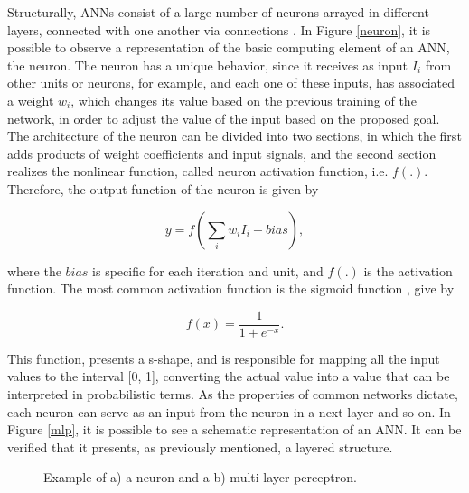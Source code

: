 Structurally, \ac{ANNs} consist of a large number of neurons arrayed in different layers, connected with one another via connections \cite{review2017}. In Figure \ref{neuron}, it is possible to observe a representation of the basic computing element of an \acs{ANN}, the neuron. 
The neuron has a unique behavior, since it receives as input $I_i$ from other units or neurons, for example, and each one of these inputs, has associated a weight $w_i$, which changes its value based on the previous training of the network, in order to adjust the value of the input based on the proposed goal. The architecture of the neuron can be divided into two sections, in which the first adds products of weight coefficients and input signals, and the second section realizes the nonlinear function, called neuron activation function, i.e. $f(.)$. Therefore, the output function of the neuron is given by \cite{ann1}

\begin{equation}
   y = f(\sum_i w_i I_i + bias), 
   \label{tauequation}
\end{equation}

where the $bias$ is specific for each iteration and unit, and $f(.)$ is the activation function. The most common activation function is the sigmoid function \cite{ann1}, give by

\begin{equation}
   f(x) = \frac{1}{1+e^{-x}}.
   \label{fequation}
\end{equation}

This function, presents a s-shape, and is responsible for mapping all the input values to the interval [0, 1], converting the actual value into a value that can be interpreted in probabilistic terms. As the properties of common networks dictate, each neuron can serve as an input from the neuron in a next layer and so on. In Figure \ref{mlp}, it is possible to see a schematic representation of an \acs{ANN}. It can be verified that it presents, as previously mentioned, a layered structure. 

\begin{figure}[h!]
\captionsetup[subfigure]{position=b}
\centering
{}
\hspace{0.05\textwidth}
\caption{Example of a) a neuron and a b) multi-layer perceptron.}
\end{figure}

